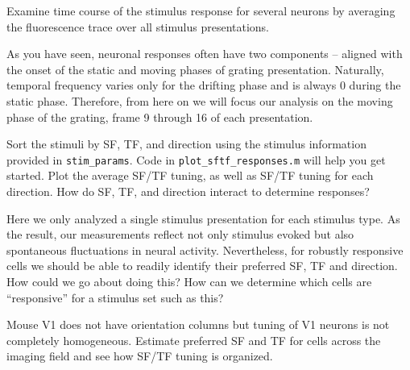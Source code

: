 \documentclass[a4paper]{report}
\newcommand{\nexercise}[0]{\arabic{exercises}\addtocounter{exercises}{1}}
\begin{document}
\begin{exercisebox}[frametitle={Exercise \nexercise: Mean response time course}]
Examine time course of the stimulus response for several neurons by averaging the fluorescence trace over all stimulus presentations.
\end{exercisebox}

As you have seen, neuronal responses often have two components -- aligned with the onset of the static and moving phases of grating presentation. 
Naturally, temporal frequency varies only for the drifting phase and is always 0 during the static phase.
Therefore, from here on we will focus our analysis on the moving phase of the grating, frame 9 through 16 of each presentation.

\begin{exercisebox}[frametitle={Exercise \nexercise: Spatial and temporal frequency tuning}]
Sort the stimuli by SF, TF, and direction using the stimulus information provided in \texttt{stim\_params}. 
Code in \texttt{plot\_sftf\_responses.m} will help you get started.
Plot the average SF/TF tuning, as well as SF/TF tuning for each direction. 
How do SF, TF, and direction interact to determine responses?
\end{exercisebox}

Here we only analyzed a single stimulus presentation for each stimulus type. 
As the result, our measurements reflect not only stimulus evoked but also spontaneous fluctuations in neural activity.
Nevertheless, for robustly responsive cells we should be able to readily identify their preferred SF, TF and direction. 
How could we go about doing this? 
How can we determine which cells are ``responsive'' for a stimulus set such as this?

\begin{exercisebox}[frametitle={Exercise \nexercise: Spatial distribution of tuning preferences in V1}]
Mouse V1 does not have orientation columns but tuning of V1 neurons is not completely homogeneous. 
Estimate preferred SF and TF for cells across the imaging field and see how SF/TF tuning is organized.
\end{exercisebox}

\end{document}
